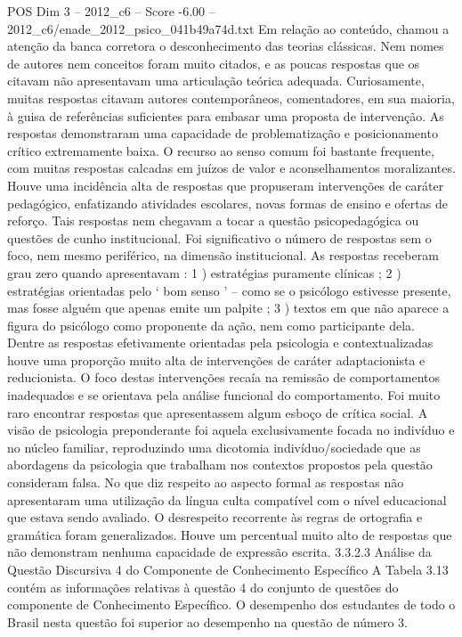 \begin{textsample}{POS Dim 3 – 2012\_c6 – Score -6.00 – 2012\_c6/enade\_2012\_psico\_041b49a74d.txt}
Em relação ao conteúdo, chamou a atenção da banca corretora o desconhecimento das teorias clássicas.
Nem nomes de autores nem conceitos foram muito citados, e as poucas respostas que os citavam não apresentavam uma articulação teórica adequada.
Curiosamente, muitas respostas citavam autores contemporâneos, comentadores, em sua maioria, à guisa de referências suficientes para embasar uma proposta de intervenção.
As respostas demonstraram uma capacidade de problematização e posicionamento crítico extremamente baixa.
O recurso ao senso comum foi bastante frequente, com muitas respostas calcadas em juízos de valor e aconselhamentos moralizantes.
Houve uma incidência alta de respostas que propuseram intervenções de caráter pedagógico, enfatizando atividades escolares, novas formas de ensino e ofertas de reforço.
Tais respostas nem chegavam a tocar a questão psicopedagógica ou questões de cunho institucional.
Foi significativo o número de respostas sem o foco, nem mesmo periférico, na dimensão institucional.
As respostas receberam grau zero quando apresentavam : 1 ) estratégias puramente clínicas ; 2 ) estratégias orientadas pelo ‘ bom senso ’ – como se o psicólogo estivesse presente, mas fosse alguém que apenas emite um palpite ; 3 ) textos em que não aparece a figura do psicólogo como proponente da ação, nem como participante dela.
Dentre as respostas efetivamente orientadas pela psicologia e contextualizadas houve uma proporção muito alta de intervenções de caráter adaptacionista e reducionista.
O foco destas intervenções recaía na remissão de comportamentos inadequados e se orientava pela análise funcional do comportamento.
Foi muito raro encontrar respostas que apresentassem algum esboço de crítica social.
A visão de psicologia preponderante foi aquela exclusivamente focada no indivíduo e no núcleo familiar, reproduzindo uma dicotomia indivíduo/sociedade que as abordagens da psicologia que trabalham nos contextos propostos pela questão consideram falsa.
No que diz respeito ao aspecto formal as respostas não apresentaram uma utilização da língua culta compatível com o nível educacional que estava sendo avaliado.
O desrespeito recorrente às regras de ortografia e gramática foram generalizados.
Houve um percentual muito alto de respostas que não demonstram nenhuma capacidade de expressão escrita. 3.3.2.3 Análise da Questão Discursiva 4 do Componente de Conhecimento Específico A Tabela 3.13 contém as informações relativas à questão 4 do conjunto de questões do componente de Conhecimento Específico.
O desempenho dos estudantes de todo o Brasil nesta questão foi superior ao desempenho na questão de número 3.

\end{textsample}
